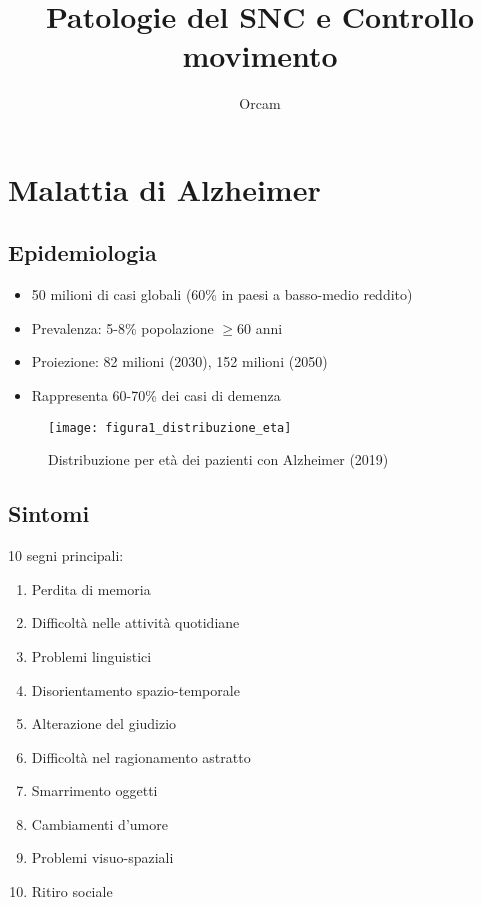\documentclass{article}
\title{Patologie del SNC e Controllo movimento}
\author{Orcam}
\date{}
\begin{document}
\maketitle

\section{Malattia di Alzheimer}
\subsection{Epidemiologia}
\begin{itemize}
    \item 50 milioni di casi globali (60\% in paesi a basso-medio reddito)
    \item Prevalenza: 5-8\% popolazione $\geq$60 anni
    \item Proiezione: 82 milioni (2030), 152 milioni (2050)
    \item Rappresenta 60-70\% dei casi di demenza
\end{itemize}

\begin{figure}[h]
    \centering
    \texttt{[image: figura1\_distribuzione\_eta]}
    \caption{Distribuzione per età dei pazienti con Alzheimer (2019)}
    \label{fig:alzheimer_eta}
\end{figure}

\subsection{Sintomi}
10 segni principali:
\begin{enumerate}
    \item Perdita di memoria
    \item Difficoltà nelle attività quotidiane
    \item Problemi linguistici
    \item Disorientamento spazio-temporale
    \item Alterazione del giudizio
    \item Difficoltà nel ragionamento astratto
    \item Smarrimento oggetti
    \item Cambiamenti d'umore
    \item Problemi visuo-spaziali
    \item Ritiro sociale
\end{enumerate}
\end{document}
